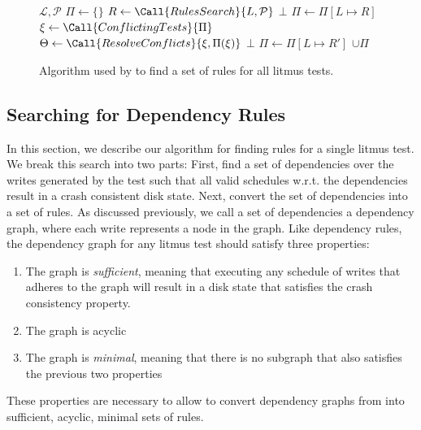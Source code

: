 \begin{figure}[h]
\begin{algorithmic}[1]
    {$\mathcal{L}, \mathcal{P}$} 
    \State $\Pi \gets \{\}$ 
      \State $R \gets \Call{RulesSearch}{L, \mathcal{P}}$
        \State \Return $\bot$
      \EndIf
      \State $\Pi \gets \Pi[L \mapsto R]$
      \State $\xi \gets \Call{ConflictingTests}{\Pi}$
      \If{$\xi \neq \emptyset$}
        \State $\Theta \gets \Call{ResolveConflicts}{\xi,\Pi(\xi)}$
        \If{$\Theta = \bot$}
          \State \Return $\bot$
        \EndIf
          \State $\Pi \gets \Pi[L \mapsto R']$
        \EndFor
      \EndIf
    \EndFor
    \State \Return $\cup\Pi$
  \EndFunction
\end{algorithmic}
\caption{Algorithm used by \depsynth to find a set of rules for all litmus tests.\tighten}
\label{alg:top-level}
\end{figure}

\subsection{Searching for Dependency Rules}
\label{l:rulessearch}
In this section, we describe our algorithm for finding rules for a single
litmus test. We break this search into two parts:
First, find a set of dependencies over the writes generated by the test
such that all valid schedules w.r.t. the dependencies result in
a crash consistent disk state.
Next, convert the set of dependencies into a set of rules.
As discussed previously, we call a set of dependencies
a dependency graph, where each write represents a node in the graph.
Like dependency rules, the dependency graph for any litmus test should satisfy
three properties:
\begin{enumerate}
  \item The graph is \textit{sufficient}, meaning that executing any schedule
        of writes that adheres to the graph will result
        in a disk state that satisfies the crash consistency property.
  \item The graph is acyclic
  \item The graph is \textit{minimal}, meaning that there is no subgraph
        that also satisfies the previous two properties
\end{enumerate}
These properties are necessary to allow \depsynth to convert dependency graphs
from  into sufficient, acyclic, minimal sets of rules.

